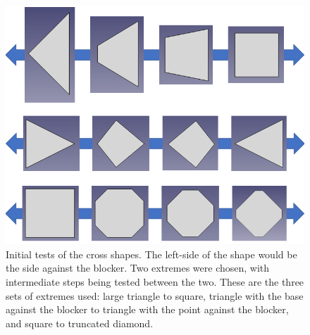 \begin{figure}
    \centering
    \includegraphics[scale=0.8]{Future_Figs/Cross-Shape-Slide.png}
    \caption{Initial tests of the cross shapes. The left-side of the shape would be the side against the blocker. Two extremes were chosen, with intermediate steps being tested between the two. These are the three sets of extremes used: large triangle to square, triangle with the base against the blocker to triangle with the point against the blocker, and square to truncated diamond.}
    \label{fig:cross-shape-slide}
\end{figure}
